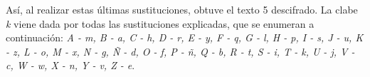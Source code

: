 \documentclass{article}
\begin{document}
    Así, al realizar estas últimas sustituciones, obtuve el texto 5 descifrado. La clabe \emph{k} viene dada por todas las sustituciones explicadas, que se enumeran a continuación: 
    \emph{A - m, B - a, C - h, D - r, E - y, F - q, G - l, H - p, I - s, J - u, K - z, L - o, M - x, N - g, Ñ - d, O - f, P - ñ, Q - b, R - t, S - i, T - k, U - j, V - c, W - w, X - n, Y - v, Z - e}.
    
\end{document}
